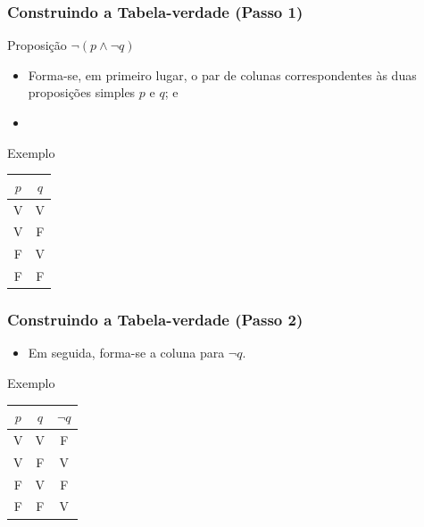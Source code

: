 \documentclass{beamer}
\begin{document}
\begin{frame}
\frametitle{Construindo a Tabela-verdade (Passo 1)}

\begin{exampleblock}{Proposição}
$\neg (p \wedge \neg q)$
\end{exampleblock}\vfill

\begin{itemize}
	\item Forma-se, em primeiro lugar, o par de colunas correspondentes às duas proposições simples $p$ e $q$; e
	\item {}
\end{itemize}\vfill

\begin{exampleblock}{Exemplo}
\center
\begin{tabular}{|c|c|}
	\hline
	$p$ & $q$ \\ \hline
	V & V  \\ \hline
	V & F  \\ \hline
	F & V  \\ \hline
	F & F  \\ \hline
\end{tabular}
\end{exampleblock}
\end{frame}

\begin{frame}
\frametitle{Construindo a Tabela-verdade (Passo 2)}

\begin{itemize}
	\item Em seguida, forma-se a coluna para $\neg q$.
\end{itemize}\vfill

\begin{exampleblock}{Exemplo}
	\center
	\begin{tabular}{|c|c|c|}
		\hline
		$p$ & $q$ & $\neg q$ \\ \hline
		V & V  & F \\ \hline
		V & F  & V \\ \hline
		F & V  & F \\ \hline
		F & F  & V \\ \hline
	\end{tabular}
\end{exampleblock}
\end{frame}
\end{document}
